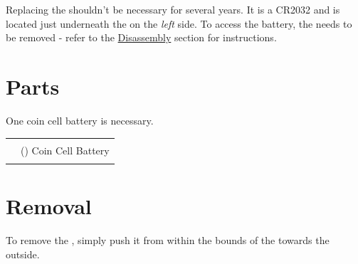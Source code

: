 Replacing the \hyperref[Coin Cell Battery]{} shouldn't be necessary for
several years.  It is a \num{CR2032} and is located just underneath the 
on the \textit{left} side.  To access the battery, the  needs to be
removed - refer to the \hyperref[Disassembly]{Disassembly} section for
instructions.

\section{Parts}

One  coin cell battery is necessary.

\begin{table}[H]
\centering
\begin{tabu} { X[1,r,m] | X[6,l,m] }
  \thrule
   &  \\  &  () Coin Cell Battery \\
  \bhrule
\end{tabu}
\end{table}

\section{Removal}

To remove the , simply push it from within the bounds of the 
towards the outside.


